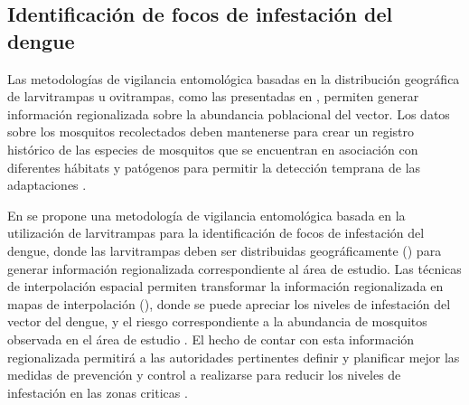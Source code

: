 \subsection{Identificación de focos de infestación del dengue}
\label{sec:cap4-identificacion-focos}
Las metodologías de vigilancia entomológica basadas en la distribución geográfica de larvitrampas
u ovitrampas, como las presentadas en
\cite{NINO2011,petric2012surveillance, journal.pone.0054167,nino2008uso}, permiten generar
información regionalizada sobre la abundancia poblacional del vector. Los datos
sobre los mosquitos recolectados deben mantenerse para crear un registro histórico de las
especies de mosquitos que se encuentran en asociación con diferentes hábitats y patógenos para
permitir la detección temprana de las adaptaciones \cite{petric2012surveillance}.

En \cite{NINO2011} se propone una metodología de vigilancia entomológica basada en la utilización
de larvitrampas para la identificación de focos de infestación del dengue, donde las larvitrampas
deben ser distribuidas geográficamente () para generar
información regionalizada correspondiente al área de estudio. Las técnicas de
interpolación espacial permiten transformar la información regionalizada en mapas de
interpolación (), donde se puede apreciar los niveles
de infestación del vector del dengue, y el riesgo correspondiente a la abundancia de mosquitos
observada en el área de estudio \cite{NINO2011}. El hecho de contar con esta información
regionalizada permitirá a las autoridades pertinentes definir y planificar mejor las medidas de
prevención y control a realizarse para reducir los niveles de infestación en las zonas criticas
\cite{NINO2011, nino2008uso, petric2012surveillance}.


